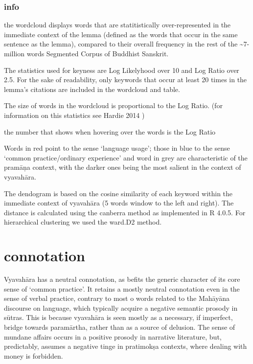 \documentclass[
  letterpaper,
  DIV=11,
  numbers=noendperiod,
  oneside]{scrreprt}
\begin{document}
\hypertarget{info-6}{%
\subsubsection{info}\label{info-6}}

the wordcloud displays words that are statitistically over-represented
in the immediate context of the lemma (defined as the words that occur
in the same sentence as the lemma), compared to their overall frequency
in the rest of the \textasciitilde7-million words Segmented Corpus of
Buddhist Sanskrit.

The statistics used for keyness are Log Likelyhood over 10 and Log Ratio
over 2.5. For the sake of readability, only keywords that occur at least
20 times in the lemma's citations are included in the wordcloud and
table.

The size of words in the wordcloud is proportional to the Log Ratio.
(for information on this statistics see Hardie 2014 )

the number that shows when hovering over the words is the Log Ratio

Words in red point to the sense `language usage'; those in blue to the
sense `common practice/ordinary experience' and word in grey are
characteristic of the pramāṇa context, with the darker ones being the
most salient in the context of vyavahāra.

The dendogram is based on the cosine similarity of each keyword within
the immediate context of vyavahāra (5 words window to the left and
right). The distance is calculated using the canberra method as
implemented in R 4.0.5. For hierarchical clustering we used the ward.D2
method.

\hypertarget{sec-connotation}{%
\section{connotation}\label{sec-connotation}}

Vyavahāra has a neutral connotation, as befits the generic character of
its core sense of `common practice'. It retains a mostly neutral
connotation even in the sense of verbal practice, contrary to most o
words related to the Mahāyāna discourse on language, which typically
acquire a negative semantic prosody in sūtras. This is because vyavahāra
is seen mostly as a necessary, if imperfect, bridge towards paramārtha,
rather than as a source of delusion. The sense of mundane affairs occurs
in a positive prosody in narrative literature, but, predictably, assumes
a negative tinge in pratimokṣa contexts, where dealing with money is
forbidden.
\end{document}
